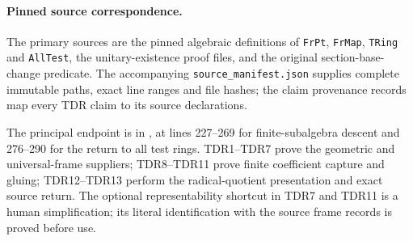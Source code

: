 \paragraph{Pinned source correspondence.}
The primary sources are the pinned algebraic definitions of
\texttt{FrPt}, \texttt{FrMap}, \texttt{TRing} and
\texttt{AllTest}, the unitary-existence proof files, and the
original section-base-change predicate.  The accompanying
\texttt{source\_manifest.json} supplies complete immutable paths,
exact line ranges and file hashes; the claim provenance records
map every TDR claim to its source declarations.

The principal endpoint is in
,
at lines 227--269 for finite-subalgebra descent and 276--290
for the return to all test rings.  TDR1--TDR7 prove the geometric
and universal-frame suppliers; TDR8--TDR11 prove finite coefficient
capture and gluing; TDR12--TDR13 perform the radical-quotient
presentation and exact source return.  The optional representability
shortcut in TDR7 and TDR11 is a human simplification; its literal
identification with the source frame records is proved before use.
